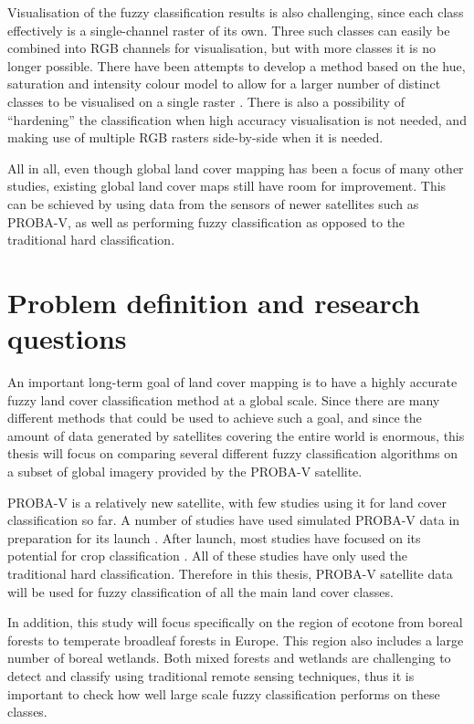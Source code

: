 \documentclass[a4paper,10pt]{article}
\begin{document}
Visualisation of the fuzzy classification results is also challenging, since each class effectively is a single-channel raster of its own. Three such classes can easily be combined into RGB channels for visualisation, but with more classes it is no longer possible. There have been attempts to develop a method based on the hue, saturation and intensity colour model to allow for a larger number of distinct classes to be visualised on a single raster \citep{hengl2004fuzzycmeans}. There is also a possibility of ``hardening'' the classification when high accuracy visualisation is not needed, and making use of multiple RGB rasters side-by-side when it is needed.

All in all, even though global land cover mapping has been a focus of many other studies, existing global land cover maps still have room for improvement. This can be schieved by using data from the sensors of newer satellites such as PROBA-V, as well as performing fuzzy classification as opposed to the traditional hard classification.

\section{Problem definition and research questions}

An important long-term goal of land cover mapping is to have a highly accurate fuzzy land cover classification method at a global scale. Since there are many different methods that could be used to achieve such a goal, and since the amount of data generated by satellites covering the entire world is enormous, this thesis will focus on comparing several different fuzzy classification algorithms on a subset of global imagery provided by the PROBA-V satellite.

PROBA-V is a relatively new satellite, with few studies using it for land cover classification so far. A number of studies have used simulated PROBA-V data in preparation for its launch \citep{stathakis2014probavurban,roumenina2013probavcrops,bartalev2014probavboreal}. After launch, most studies have focused on its potential for crop classification \citep{roumenina2015probavcrops,durgun2016crop,lambert2016cropland}. All of these studies have only used the traditional hard classification. Therefore in this thesis, PROBA-V satellite data will be used for fuzzy classification of all the main land cover classes.

In addition, this study will focus specifically on the region of ecotone from boreal forests to temperate broadleaf forests in Europe. This region also includes a large number of boreal wetlands. Both mixed forests and wetlands are challenging to detect and classify using traditional remote sensing techniques, thus it is important to check how well large scale fuzzy classification performs on these classes.
\end{document}
